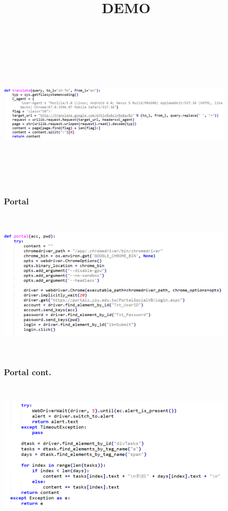 \documentclass{beamer}
\begin{document}
\begin{CJK}{UTF8}{bkai}
\begin{frame}%
\frametitle{}
\includegraphics[width=12cm,height=7.5cm]{translate.png} 
\titlepage
\end{frame}

\begin{frame}%
\frametitle{\Huge Portal}
\includegraphics[width=12cm,height=7.5cm]{portal1.png} 
\titlepage
\end{frame}

\begin{frame}%
\frametitle{\Huge Portal cont.}
\includegraphics[width=12cm,height=7.5cm]{portal2.png} 
\titlepage
\end{frame}

\begin{frame}%
\title{\Huge DEMO}
\titlepage
\end{frame}

\end{CJK}
\end{document}
